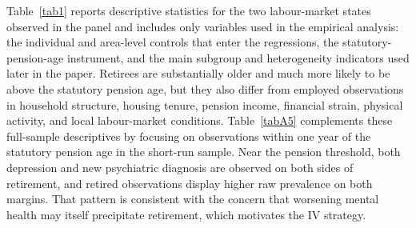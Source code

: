 \documentclass[arguments, manuscript, 11pt]{aastex631}
\begin{document}
Table~\ref{tab1} reports descriptive statistics for the two labour-market states observed in the panel and includes only variables used in the empirical analysis: the individual and area-level controls that enter the regressions, the statutory-pension-age instrument, and the main subgroup and heterogeneity indicators used later in the paper. Retirees are substantially older and much more likely to be above the statutory pension age, but they also differ from employed observations in household structure, housing tenure, pension income, financial strain, physical activity, and local labour-market conditions. Table~\ref{tabA5} complements these full-sample descriptives by focusing on observations within one year of the statutory pension age in the short-run sample. Near the pension threshold, both depression and new psychiatric diagnosis are observed on both sides of retirement, and retired observations display higher raw prevalence on both margins. That pattern is consistent with the concern that worsening mental health may itself precipitate retirement, which motivates the IV strategy.
\end{document}
